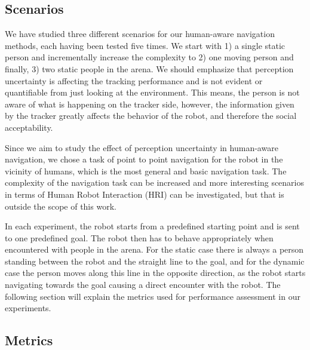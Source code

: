 \subsection{Scenarios}
\label{sec:scenarios}

We have studied three different scenarios for our human-aware navigation methods, each having been tested five times. We start with 1) a single static person and incrementally increase the complexity to 2) one moving person and finally, 3) two static people in the arena. We should emphasize that perception uncertainty is affecting the tracking performance and is not evident or quantifiable from just looking at the environment. This means, the person is not aware of what is happening on the tracker side, however, the information given by the tracker greatly affects the behavior of the robot, and therefore the social acceptability. 


Since we aim to study the effect of perception uncertainty in human-aware navigation, we chose a task of point to point navigation for the robot in the vicinity of humans, which is the most general and basic navigation task. The complexity of the navigation task can be increased and more interesting scenarios in terms of Human Robot Interaction (HRI) can be investigated, but that is outside the scope of this work. 

In each experiment, the robot starts from a predefined starting point and is sent to one predefined goal. The robot then has to behave appropriately when encountered with people in the arena. For the static case there is always a person standing between the robot and the straight line to the goal, and for the dynamic case the person moves along this line in the opposite direction, as the robot starts navigating towards the goal causing a direct encounter with the robot. The following section will explain the metrics used for performance assessment in our experiments.

%




\subsection{Metrics}

